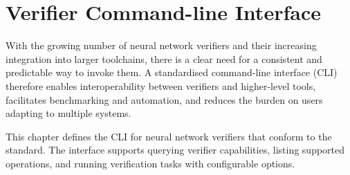 
\newcommand{\clOutputOption}[3]{
\paragraph{\texttt{#1}}
\begin{itemize}
    \item \textbf{Description}: #2
    \item \textbf{Output}: #3
    \item \textbf{Example usage}:
\end{itemize}
}

\newcommand{\clOption}[3]{
\paragraph{\texttt{#1}}
\begin{itemize}
    \item \textbf{Description}: #2
    \item \textbf{Example usage}: \texttt{#3}
\end{itemize}
}


\newcommand{\exampleVerifier}{checkNN}

\chapter{Verifier Command-line Interface}
\label{sec:solver_interface}

With the growing number of neural network verifiers and their increasing integration into larger toolchains, there is a clear need for a consistent and predictable way to invoke them. A standardised command-line interface (CLI) therefore enables interoperability between verifiers and higher-level tools, facilitates benchmarking and automation, and reduces the burden on users adapting to multiple systems.

This chapter defines the CLI for neural network verifiers that conform to the \vnnlib{} standard. The interface supports querying verifier capabilities, listing supported operations, and running verification tasks with configurable options.


